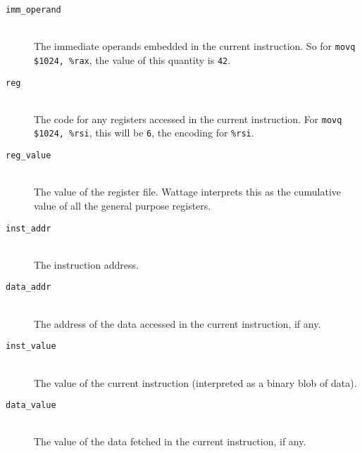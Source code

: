 \begin{description}
  \item[\texttt{imm\_operand}]\hfill \\ The immediate operands
    embedded in the current instruction.  So for \texttt{movq \$1024,
      \%rax}, the value of this quantity is \texttt{42}.
    
  \item[\texttt{reg}] \hfill \\ The code for any registers accessed in
    the current instruction.  For \texttt{movq \$1024, \%rsi}, this
    will be \texttt{6}, the encoding for \texttt{\%rsi}.
    
  \item[\texttt{reg\_value}] \hfill \\ The value of the register file.
    Wattage interprets this as the cumulative value of all the general
    purpose registers.

  \item[\texttt{inst\_addr}] \hfill \\ The instruction address.

  \item[\texttt{data\_addr}] \hfill \\ The address of the data
    accessed in the current instruction, if any.

  \item[\texttt{inst\_value}] \hfill \\ The value of the current
    instruction (interpreted as a binary blob of data).

  \item[\texttt{data\_value}] \hfill \\ The value of the data fetched
    in the current instruction, if any.

\end{description}

